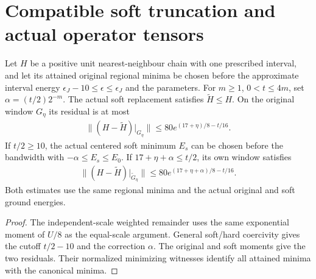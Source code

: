 \section{Compatible soft truncation and actual operator tensors}

\begin{lemma}
    \label{thm:interval_physical_scaled_soft_residuals}
    \leanok
    Let $H$ be a positive unit nearest-neighbour chain with one
    prescribed interval, and let its attained original regional
    minima be chosen before the approximate interval energy
    $\epsilon_J-10\leq\epsilon\leq\epsilon_J$ and the parameters.
    For $m\geq1$, $0<t\leq4m$, set $\alpha=(t/2)2^{-m}$.
    The actual soft replacement satisfies $\widetilde H\leq H$.
    On the original window $G_\eta$ its residual is at most
    \begin{align*}
        \|(H-\widetilde H)|_{G_\eta}\|
        \leq80e^{(17+\eta)/8-t/16}.
    \end{align*}
    If $t/2\geq10$, the actual centered soft minimum $E_s$ can
    be chosen before the bandwidth with $-\alpha\leq E_s\leq E_0$.
    If $17+\eta+\alpha\leq t/2$, its own window satisfies
    \begin{align*}
        \|(H-\widetilde H)|_{\widetilde G_\eta}\|
        \leq80e^{(17+\eta+\alpha)/8-t/16}.
    \end{align*}
    Both estimates use the same regional minima and the actual
    original and soft ground energies.
\end{lemma}
\begin{proof}\leanok
    The independent-scale weighted remainder uses the same
    exponential moment of $U/8$ as the equal-scale argument.
    General soft/hard coercivity gives the cutoff $t/2-10$ and
    the correction $\alpha$. The original and soft moments give
    the two residuals. Their normalized minimizing witnesses
    identify all attained minima with the canonical minima.
\end{proof}

